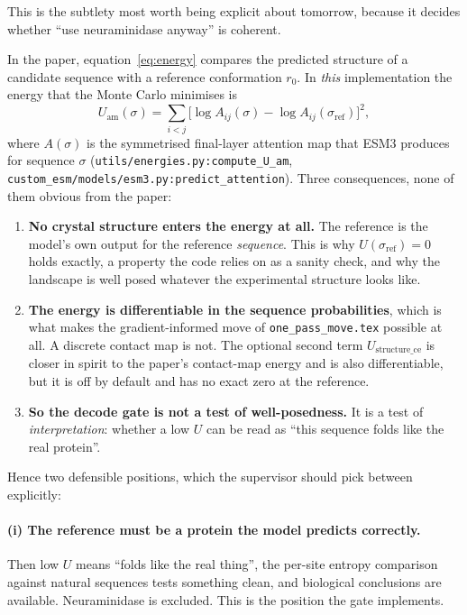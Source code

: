 \documentclass[11pt,a4paper]{article}
\newcommand{\file}[1]{\texttt{#1}}
\begin{document}
This is the subtlety most worth being explicit about tomorrow, because it decides
whether ``use neuraminidase anyway'' is coherent.

In the paper, equation~\eqref{eq:energy} compares the predicted structure of a
candidate sequence with a reference conformation $r_0$. In \emph{this}
implementation the energy that the Monte Carlo minimises is
\begin{equation}
U_{\mathrm{am}}(\sigma) = \sum_{i<j}
  \Big[ \log A_{ij}(\sigma) - \log A_{ij}(\sigma_{\text{ref}}) \Big]^2 ,
\label{eq:uam}
\end{equation}
where $A(\sigma)$ is the symmetrised final-layer attention map that ESM3 produces
for sequence $\sigma$ (\file{utils/energies.py:compute\_U\_am},
\file{custom\_esm/models/esm3.py:predict\_attention}). Three consequences, none
of them obvious from the paper:

\begin{enumerate}
  \item \textbf{No crystal structure enters the energy at all.} The reference is
        the model's own output for the reference \emph{sequence}. This is why
        $U(\sigma_{\text{ref}}) = 0$ holds exactly, a property the code relies on
        as a sanity check, and why the landscape is well posed whatever the
        experimental structure looks like.
  \item \textbf{The energy is differentiable in the sequence probabilities},
        which is what makes the gradient-informed move of
        \file{one\_pass\_move.tex} possible at all. A discrete contact map is
        not. The optional second term $U_{\text{structure\_ce}}$ is closer in
        spirit to the paper's contact-map energy and is also differentiable, but
        it is off by default and has no exact zero at the reference.
  \item \textbf{So the decode gate is not a test of well-posedness.} It is a test
        of \emph{interpretation}: whether a low $U$ can be read as ``this
        sequence folds like the real protein''.
\end{enumerate}

Hence two defensible positions, which the supervisor should pick between
explicitly:

\paragraph{(i) The reference must be a protein the model predicts correctly.}
Then low $U$ means ``folds like the real thing'', the per-site entropy comparison
against natural sequences tests something clean, and biological conclusions are
available. Neuraminidase is excluded. This is the position the gate implements.
\end{document}
